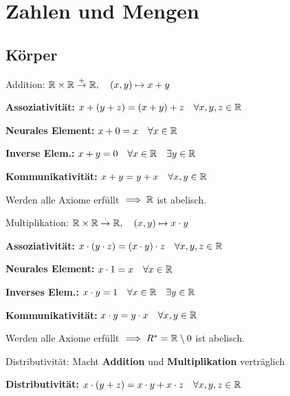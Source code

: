 
\section{Zahlen und Mengen}

\subsection{Körper}
\begin{compactdesc}
    \item[Addition:] $\mathbb{R} \times \mathbb{R} \overset{+}{\to} \mathbb{R}, \quad (x, y) \mapsto x + y$
        \begin{compactenum}[{A}.1]
            \item \textbf{Assoziativität:} $x + \left( y + z \right) = \left( x + y \right) + z  \quad \forall x,y,z \in \mathbb{R}$
            \item \textbf{Neurales Element:} $x + 0 = x \quad \forall x \in \mathbb{R}$
            \item \textbf{Inverse Elem.:} $x + y = 0 \quad  \forall x \in \mathbb{R} \quad \exists y \in \mathbb{R}$
            \item \textbf{Kommunikativität:} $x + y = y + x \quad \forall x,y \in  \mathbb{R}$
        \end{compactenum}
     Werden alle Axiome erfüllt $\implies \mathbb{R}$ ist abelisch.
 \item[Multiplikation:] $\mathbb{R} \times \mathbb{R} \overset{\cdot}{\to} \mathbb{R}, \quad (x, y) \mapsto x \cdot y$
        \begin{compactenum}[{M}.1]
            \item \textbf{Assoziativität:} $x \cdot \left( y \cdot z \right) = \left( x \cdot y \right) \cdot z \quad \forall x,y,z \in \mathbb{R}$
            \item \textbf{Neurales Element:} $x \cdot  1 = x \quad \forall x \in \mathbb{R}$
            \item \textbf{Inverses Elem.:} $x \cdot y = 1 \quad \forall  x \in \mathbb{R} \quad \exists y \in \mathbb{R}$
            \item \textbf{Kommunikativität:} $x \cdot y = y \cdot x \quad \forall x,y \in \mathbb{R}$
        \end{compactenum}
    Werden alle Axiome erfüllt $\implies R^* = \mathbb{R} \setminus 0$ ist abelisch.
    \item[Distributivität:] Macht \textbf{Addition} und \textbf{Multiplikation} verträglich
        \begin{compactenum}[{D}.1]
            \item \textbf{Distributivität:} $x \cdot \left( y + z \right) = x \cdot y + x \cdot z \quad \forall x,y,z \in \mathbb{R}$

\end{compactenum}
\end{compactdesc}
